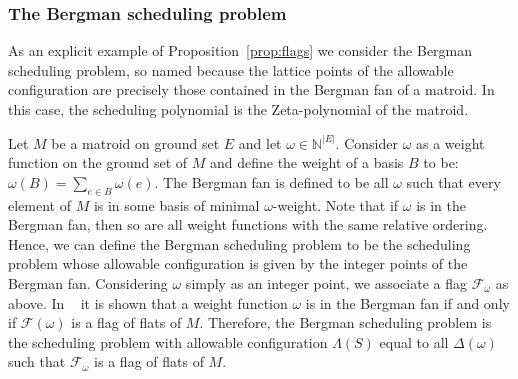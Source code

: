 \documentclass[12pt,reqno]{amsart}
\numberwithin{definition}{section}
\theoremstyle{definition}
\newcommand{\om}{\omega}
\newcommand{\allow}{\Lambda} %
\begin{document}
\subsubsection{The Bergman scheduling problem} As an explicit example of Proposition~\ref{prop:flags} we consider the Bergman
scheduling problem, so named because the lattice points of the
allowable configuration are precisely those contained in the Bergman
fan of a matroid. In this case, the scheduling polynomial is the
Zeta-polynomial of the matroid.

Let $M$ be a matroid on ground set $E$ and let $\omega \in
\mathbb{N}^{|E|}$.  Consider $\omega$ as a weight function on the ground
set of $M$ and define the weight of a basis $B$ to be: $\omega(B) =
\sum_{e\in B} \omega(e)$.  The Bergman fan is defined to be  all
$\omega$ such that every element of $M$ is in some basis of minimal $\omega$-weight.  Note that if $\omega$ is in the Bergman fan, then so are all
weight functions with the same relative ordering.  Hence, we can
define the Bergman scheduling problem to be the scheduling problem
whose allowable configuration is given by the integer points of the
Bergman fan.
  Considering $\omega$ simply as an integer
  point, we associate a flag $\mathscr{F}_{\omega}$ as above.
In ~\cite{AK} it is shown that a weight function $\omega$ is  in the Bergman fan
if and only if $\mathscr{F}(\om)$ is a flag of flats of $M$.
Therefore, the Bergman scheduling problem is the scheduling problem with allowable configuration $\allow(S)$ equal to all $\Delta(\om)$ such that $\mathcal{F}_{\omega}$ is a flag of flats of $M$. 

\end{document}
